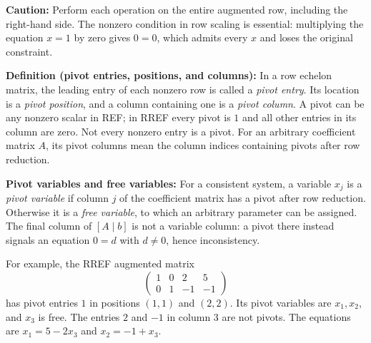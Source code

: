 \documentclass[a4paper,11pt,abstract=true]{scrartcl}
\theoremstyle{dotlessP}
\theoremstyle{dotlessS}
\theoremstyle{remark}
\theoremstyle{definition}
\begin{document}
\begin{remark_box}
\textbf{Caution:} Perform each operation on the entire augmented
row, including the right-hand side. The nonzero condition in row
scaling is essential: multiplying the equation $x=1$ by zero gives
$0=0$, which admits every $x$ and loses the original constraint.
\end{remark_box}

\begin{definition_box}
\textbf{Definition (pivot entries, positions, and columns):}
In a row echelon matrix, the leading entry of each nonzero row is
called a \emph{pivot entry}. Its location is a \emph{pivot position},
and a column containing one is a \emph{pivot column}. A pivot can be
any nonzero scalar in REF\@; in RREF every pivot is $1$ and all other
entries in its column are zero. Not every nonzero entry is a pivot.
For an arbitrary coefficient matrix $A$, its pivot columns mean the
column indices containing pivots after row reduction.
\end{definition_box}

\begin{claim_box}
\textbf{Pivot variables and free variables:} For a consistent
system, a variable $x_j$ is a \emph{pivot variable} if column $j$ of
the coefficient matrix has a pivot after row reduction. Otherwise it
is a \emph{free variable}, to which an arbitrary parameter can be
assigned. The final column of $[A\mid b]$ is not a variable column:
a pivot there instead signals an equation $0=d$ with $d\neq0$, hence
inconsistency.

For example, the RREF augmented matrix
\[
\left(\begin{array}{ccc|c}1&0&2&5\\0&1&-1&-1\end{array}\right)
\]
has pivot entries $1$ in positions $(1,1)$ and $(2,2)$. Its pivot
variables are $x_1,x_2$, and $x_3$ is free. The entries $2$ and $-1$
in column $3$ are not pivots. The equations are
$x_1=5-2x_3$ and $x_2=-1+x_3$.
\end{claim_box}
\end{document}
